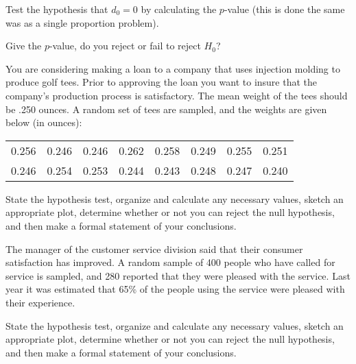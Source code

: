 \begin{problem}
\begin{subproblem}
  \item Test the hypothesis that $d_{0} = 0$ by calculating the
    $p$-value (this is done the same was as a single proportion
    problem).

    \vfill

  \item Give the $p$-value, do you reject or fail to reject $H_{0}$?

    \vfill

  \end{subproblem}

  \clearpage

\item You are considering making a loan to a company that uses
  injection molding to produce golf tees. Prior to approving the loan
  you want to insure that the company's production process is
  satisfactory. The mean weight of the tees should be .250 ounces. A
  random set of tees are sampled, and the weights are given below (in ounces): \\
  \begin{tabular}{rrrrrrrr}
    0.256 & 0.246 & 0.246 & 0.262 & 0.258 & 0.249 & 0.255 & 0.251 \\
    0.246 & 0.254 & 0.253 & 0.244 & 0.243 & 0.248 & 0.247 & 0.240
  \end{tabular}

  State the hypothesis test, organize and calculate any necessary
  values, sketch an appropriate plot, determine whether or not you can
  reject the null hypothesis, and then make a formal statement of your
  conclusions.

    \vfill
    \clearpage

  \item The manager of the customer service division said that their
    consumer satisfaction has improved. A random sample of 400 people
    who have called for service is sampled, and 280 reported that they
    were pleased with the service. Last year it was estimated that
    65\% of the people using the service were pleased with their
    experience.

    State the hypothesis test, organize and calculate any necessary
    values, sketch an appropriate plot, determine whether or not you
    can reject the null hypothesis, and then make a formal statement
    of your conclusions.

    \vfill
    \clearpage

\end{problem}
